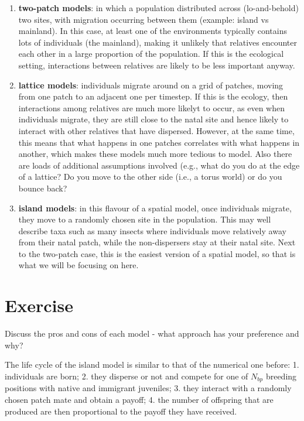 \documentclass[
]{book}
\begin{document}
\begin{enumerate}
\def\labelenumi{\arabic{enumi}.}
\item
  \textbf{two-patch models}: in which a population distributed across (lo-and-behold) two sites, with migration occurring between them (example: island vs mainland). In this case, at least one of the environments typically contains lots of individuals (the mainland), making it unlikely that relatives encounter each other in a large proportion of the population. If this is the ecological setting, interactions between relatives are likely to be less important anyway.
\item
  \textbf{lattice models}: individuals migrate around on a grid of patches, moving from one patch to an adjacent one per timestep. If this is the ecology, then interactions among relatives are much more likelyt to occur, as even when individuals migrate, they are still close to the natal site and hence likely to interact with other relatives that have dispersed. However, at the same time, this means that what happens in one patches correlates with what happens in another, which makes these models much more tedious to model. Also there are loads of additional assumptions involved (e.g., what do you do at the edge of a lattice? Do you move to the other side (i.e., a torus world) or do you bounce back?
\item
  \textbf{island models}: in this flavour of a spatial model, once individuals migrate, they move to a randomly chosen site in the population. This may well describe taxa such as many insects where individuals move relatively away from their natal patch, while the non-dispersers stay at their natal site. Next to the two-patch case, this is the easiest version of a spatial model, so that is what we will be focusing on here.
\end{enumerate}

\hypertarget{exercise-7}{%
\section{Exercise}\label{exercise-7}}

Discuss the pros and cons of each model - what approach has your preference and why?

The life cycle of the island model is similar to that of the numerical one before: 1. individuals are born; 2. they disperse or not and compete for one of \(N_{bp}\) breeding positions with native and immigrant juveniles; 3. they interact with a randomly chosen patch mate and obtain a payoff; 4. the number of offspring that are produced are then proportional to the payoff they have received.
\end{document}
